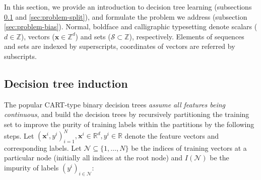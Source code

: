 \documentclass[sn-mathphys]{sn-jnl}%
\theoremstyle{thmstyleone}%
\theoremstyle{thmstyletwo}%
\theoremstyle{thmstylethree}%
\begin{document}
In this section, we provide an introduction to decision tree learning (subsections \ref{sec:problem-intro} and \ref{sec:problem-split}), and formulate the problem we address (subsection \ref{sec:problem-bias}).
Normal, boldface and calligraphic typesetting denote scalars ($d \in\mathbb{Z}$), vectors ($\mathbf{x}\in\mathbb{Z}^d$) and sets ($\mathcal{S}\subset\mathbb{Z}$), respectively. Elements of sequences and sets are indexed by superscripts, coordinates of vectors are referred by subscripts.

\subsection{Decision tree induction}
\label{sec:problem-intro}

The popular CART-type binary decision trees \citep{cart} \emph{assume all features being continuous}, and build the decision trees by recursively partitioning the training set to improve the purity of training labels within the partitions by the following steps. Let $(\mathbf{x}^i, y^i)_{i=1}^{N}, \mathbf{x}^i \in \mathbb{R}^{d}, y^i\in\mathbb{R}$ denote the feature vectors and corresponding labels. Let $\mathcal{N}\subseteq \lbrace 1, \dots, N\rbrace$ be the indices of training vectors at a particular node (initially all indices at the root node) and $I(\mathcal{N})$ be the impurity of labels $(y^i)_{i\in\mathcal{N}}$:
\end{document}
